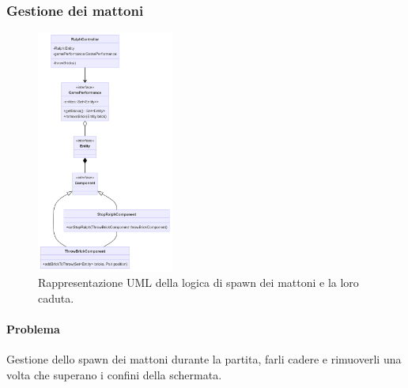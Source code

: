 \documentclass[a4paper,12pt]{report}
\begin{document}
\subsubsection{Gestione dei mattoni}

\begin{figure}[H]
\centering{}
\includegraphics[width=0.4\textwidth]{img/Mattoni.png}
\caption{Rappresentazione UML della logica di spawn dei mattoni e la loro caduta.}
\end{figure}

\paragraph{Problema} Gestione dello spawn dei mattoni durante la partita, farli cadere e rimuoverli una volta che superano i confini della schermata.
\end{document}
